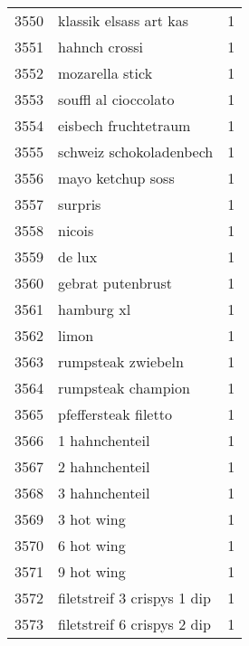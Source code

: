 \begin{tabular}{llr}
3550 &                             klassik elsass art kas &      1 \\
3551 &                                      hahnch crossi &      1 \\
3552 &                                    mozarella stick &      1 \\
3553 &                               souffl al cioccolato &      1 \\
3554 &                               eisbech fruchtetraum &      1 \\
3555 &                            schweiz schokoladenbech &      1 \\
3556 &                                  mayo ketchup soss &      1 \\
3557 &                                            surpris &      1 \\
3558 &                                             nicois &      1 \\
3559 &                                             de lux &      1 \\
3560 &                                  gebrat putenbrust &      1 \\
3561 &                                         hamburg xl &      1 \\
3562 &                                              limon &      1 \\
3563 &                                 rumpsteak zwiebeln &      1 \\
3564 &                                 rumpsteak champion &      1 \\
3565 &                               pfeffersteak filetto &      1 \\
3566 &                                     1 hahnchenteil &      1 \\
3567 &                                     2 hahnchenteil &      1 \\
3568 &                                     3 hahnchenteil &      1 \\
3569 &                                         3 hot wing &      1 \\
3570 &                                         6 hot wing &      1 \\
3571 &                                         9 hot wing &      1 \\
3572 &                        filetstreif 3 crispys 1 dip &      1 \\
3573 &                        filetstreif 6 crispys 2 dip &      1 \\

\end{tabular}

